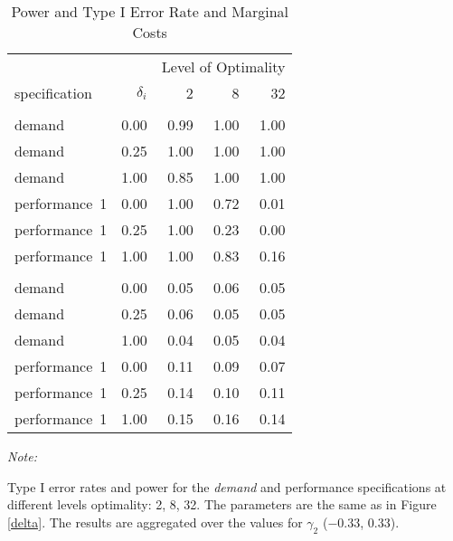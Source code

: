 \begin{table}

\caption{\label{tab:delta-table}Power and Type I Error Rate and Marginal Costs}
\centering
\fontsize{9}{11}\selectfont
\begin{threeparttable}
\begin{tabular}[t]{lrrrr}
\toprule
\multicolumn{1}{c}{ } & \multicolumn{1}{c}{ } & \multicolumn{3}{c}{Level of Optimality} \\
\cmidrule(l{3pt}r{3pt}){3-5}
specification & $\delta_i$ & 2 & 8 & 32\\
\midrule
\addlinespace[0.3em]
\multicolumn{5}{c}{\textbf{Power}}\\
\hspace{1em}demand & 0.00 & 0.99 & 1.00 & 1.00\\
\hspace{1em}demand & 0.25 & 1.00 & 1.00 & 1.00\\
\hspace{1em}demand & 1.00 & 0.85 & 1.00 & 1.00\\
\hspace{1em}performance~1 & 0.00 & 1.00 & 0.72 & 0.01\\
\hspace{1em}performance~1 & 0.25 & 1.00 & 0.23 & 0.00\\
\hspace{1em}performance~1 & 1.00 & 1.00 & 0.83 & 0.16\\
\addlinespace[0.3em]
\multicolumn{5}{c}{\textbf{Type I}}\\
\hspace{1em}demand & 0.00 & 0.05 & 0.06 & 0.05\\
\hspace{1em}demand & 0.25 & 0.06 & 0.05 & 0.05\\
\hspace{1em}demand & 1.00 & 0.04 & 0.05 & 0.04\\
\hspace{1em}performance~1 & 0.00 & 0.11 & 0.09 & 0.07\\
\hspace{1em}performance~1 & 0.25 & 0.14 & 0.10 & 0.11\\
\hspace{1em}performance~1 & 1.00 & 0.15 & 0.16 & 0.14\\
\bottomrule
\end{tabular}
\begin{tablenotes}
\item \textit{Note: } 
\item Type I error rates and power for the \emph{demand} 
            and performance specifications at different
            levels optimality: 2, 8, 32. The
            parameters are the same as in Figure
            \ref{delta}. The results are aggregated over the
            values for $\gamma_2$ ($-0.33$, $0.33$).
\end{tablenotes}
\end{threeparttable}
\end{table}